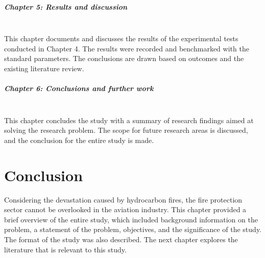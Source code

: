 \subparagraph*{Chapter 5: Results and discussion}\hfill\\
This chapter documents and discusses the results of the experimental tests conducted in Chapter 4. The results were recorded and benchmarked with the standard parameters. The conclusions are drawn based on outcomes and the existing literature review.  

\subparagraph*{Chapter 6: Conclusions and further work}\hfill\\
This chapter concludes the study with a summary of research findings aimed at solving the research problem. The scope for future research areas is discussed, and the conclusion for the entire study is made. 

\section{Conclusion}
Considering the devastation caused by hydrocarbon fires, the fire protection sector cannot be overlooked in the aviation industry. This chapter provided a brief overview of the entire study, which included background information on the problem, a statement of the problem, objectives, and the significance of the study. The format of the study was also described. The next chapter explores the literature that is relevant to this study.